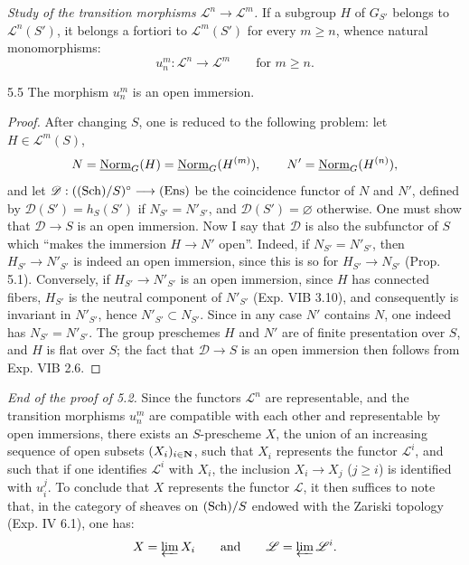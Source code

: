 \par\noindent\emph{Study of the transition morphisms $\mathscr L^n\to\mathscr L^m$.}
If a subgroup $H$ of $G_{S'}$ belongs to $\mathscr L^n(S')$, it belongs a fortiori to $\mathscr L^m(S')$ for every $m\geq n$, whence natural monomorphisms:
\[
u_n^m:\mathscr L^n\to\mathscr L^m\qquad\text{for }m\geq n.
\]
\begin{lemma}{5.5}\label{XV.5.5}
The morphism $u_n^m$ is an open immersion.
\end{lemma}
\begin{proof}
After changing $S$, one is reduced to the following problem: let $H\in\mathscr L^m(S)$,
\[
N=\underline{\mathrm{Norm}}_G(H)=\underline{\mathrm{Norm}}_G(H^{(m)}),\qquad N'=\underline{\mathrm{Norm}}_G(H^{(n)}),
\]
and let $\mathscr D:(\textup{(Sch)}/S)^\circ\longrightarrow\textup{(Ens)}$ be the coincidence functor of $N$ and $N'$, defined by $\mathscr D(S')=h_S(S')$ if $N_{S'}=N'_{S'}$, and $\mathscr D(S')=\varnothing$ otherwise. One must show that $\mathscr D\to S$ is an open immersion. Now I say that $\mathscr D$ is also the subfunctor of $S$ which ``makes the immersion $H\to N'$ open''. Indeed, if $N_{S'}=N'_{S'}$, then $H_{S'}\to N'_{S'}$ is indeed an open immersion, since this is so for $H_{S'}\to N_{S'}$ (Prop. 5.1). Conversely, if $H_{S'}\to N'_{S'}$ is an open immersion, since $H$ has connected fibers, $H_{S'}$ is the neutral component of $N'_{S'}$ (Exp. VIB 3.10), and consequently is invariant in $N'_{S'}$, hence $N'_{S'}\subset N_{S'}$. Since in any case $N'$ contains $N$, one indeed has $N_{S'}=N'_{S'}$. The group preschemes $H$ and $N'$ are of finite presentation over $S$, and $H$ is flat over $S$; the fact that $\mathscr D\to S$ is an open immersion then follows from Exp. VIB 2.6.
\end{proof}

\par\noindent\emph{End of the proof of 5.2.}
Since the functors $\mathscr L^n$ are representable, and the transition morphisms $u_n^m$ are compatible with each other and representable by open immersions, there exists an $S$-prescheme $X$, the union of an increasing sequence of open subsets $(X_i)_{i\in\mathbf{N}}$, such that $X_i$ represents the functor $\mathscr L^i$, and such that if one identifies $\mathscr L^i$ with $X_i$, the inclusion $X_i\to X_j$ ($j\geq i$) is identified with $u_i^j$. To conclude that $X$ represents the functor $\mathscr L$, it then suffices to note that, in the category of sheaves on $\textup{(Sch)}/S$ endowed with the Zariski topology (Exp. IV 6.1), one has:
\[
X=\varprojlim X_i\qquad\text{and}\qquad\mathscr L=\varprojlim\mathscr L^i.
\]

